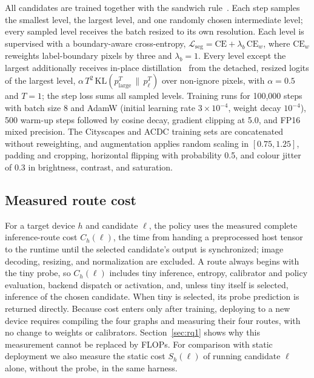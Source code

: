 \documentclass[a4paper,5p]{elsarticle}
\begin{document}
All candidates are trained together with the sandwich rule~\cite{yu2019usnet}. Each step samples the smallest level, the largest level, and one randomly chosen intermediate level; every sampled level receives the batch resized to its own resolution. Each level is supervised with a boundary-aware cross-entropy, $\mathcal{L}_{\mathrm{seg}}=\mathrm{CE}+\lambda_b\,\mathrm{CE}_w$, where $\mathrm{CE}_w$ reweights label-boundary pixels by three and $\lambda_b=1$. Every level except the largest additionally receives in-place distillation~\cite{hinton2015distilling} from the detached, resized logits of the largest level, $\alpha\,T^2\,\mathrm{KL}(p_{\mathrm{large}}^{T}\,\|\,p_\ell^{T})$ over non-ignore pixels, with $\alpha=0.5$ and $T=1$; the step loss sums all sampled levels. Training runs for 100,000 steps with batch size 8 and AdamW (initial learning rate $3\times10^{-4}$, weight decay $10^{-4}$), 500 warm-up steps followed by cosine decay, gradient clipping at 5.0, and FP16 mixed precision. The Cityscapes and ACDC training sets are concatenated without reweighting, and augmentation applies random scaling in $[0.75,1.25]$, padding and cropping, horizontal flipping with probability 0.5, and colour jitter of 0.3 in brightness, contrast, and saturation.

\subsection{Measured route cost}
\label{sec:measured-cost}

For a target device $h$ and candidate $\ell$, the policy uses the measured complete inference-route cost $C_h(\ell)$, the time from handing a preprocessed host tensor to the runtime until the selected candidate's output is synchronized; image decoding, resizing, and normalization are excluded. A route always begins with the tiny probe, so $C_h(\ell)$ includes tiny inference, entropy, calibrator and policy evaluation, backend dispatch or activation, and, unless tiny itself is selected, inference of the chosen candidate. When tiny is selected, its probe prediction is returned directly. Because cost enters only after training, deploying to a new device requires compiling the four graphs and measuring their four routes, with no change to weights or calibrators. Section~\ref{sec:rq1} shows why this measurement cannot be replaced by FLOPs. For comparison with static deployment we also measure the static cost $S_h(\ell)$ of running candidate $\ell$ alone, without the probe, in the same harness.
\end{document}
